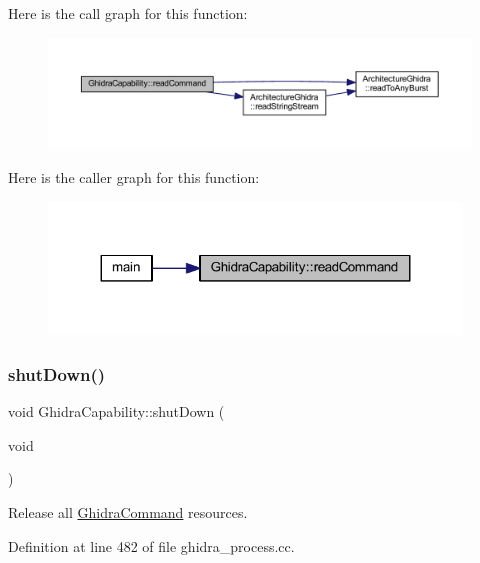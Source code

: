 Here is the call graph for this function\+:
\nopagebreak
\begin{figure}[H]
\begin{center}
\leavevmode
\includegraphics[width=350pt]{class_ghidra_capability_a778472d4da43daeda23553684f87ad80_cgraph}
\end{center}
\end{figure}
Here is the caller graph for this function\+:
\nopagebreak
\begin{figure}[H]
\begin{center}
\leavevmode
\includegraphics[width=311pt]{class_ghidra_capability_a778472d4da43daeda23553684f87ad80_icgraph}
\end{center}
\end{figure}
\mbox{\label{class_ghidra_capability_a3fd0105536597651f42c98ed1dbc2b7e}} 
\subsubsection{\texorpdfstring{shutDown()}{shutDown()}}
{\footnotesize\ttfamily void Ghidra\+Capability\+::shut\+Down (\begin{DoxyParamCaption}\item[{void}]{ }\end{DoxyParamCaption})\hspace{0.3cm}{\ttfamily [static]}}



Release all \mbox{\hyperlink{class_ghidra_command}{Ghidra\+Command}} resources. 



Definition at line 482 of file ghidra\+\_\+process.\+cc.


